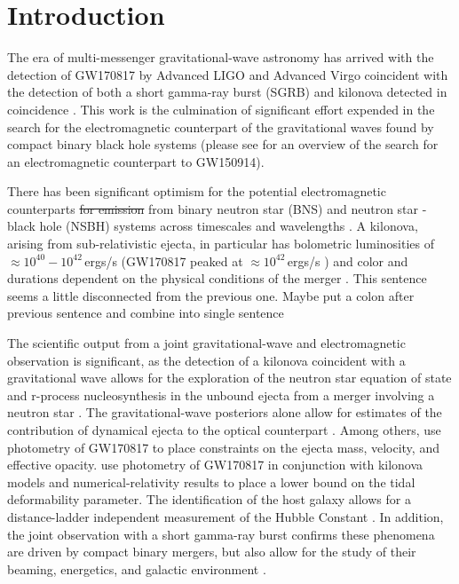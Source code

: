 \documentclass[twocolumn]{aastex62}
\begin{document}

\section{Introduction}
\label{sec:Intro}

The era of multi-messenger gravitational-wave astronomy has arrived with the detection of GW170817 \citep{AbEA2017b} by Advanced LIGO \citep{aLIGO} and Advanced Virgo \citep{adVirgo} coincident with the detection of both a short gamma-ray burst (SGRB) \citep{AbEA2017c,AbEA2017d,AbEA2017e} and kilonova detected in coincidence \citep{CoFo2017,SmCh2017,AbEA2017f}. 
This work is the culmination of significant effort expended in the search for the electromagnetic counterpart of the gravitational waves found by compact binary black hole systems \citep{AbEA2016a,AbEA2016g,AbEA2017} (please see \cite{AbEA2016b} for an overview of the search for an electromagnetic counterpart to GW150914).

There has been significant optimism for the potential electromagnetic counterparts \sout{for emission} from binary neutron star {\color{green}(BNS)} and neutron star - black hole {\color{green}(NSBH)} systems across timescales and wavelengths \citep{Nakar2007,MeBe2012}. 
A  kilonova, arising from sub-relativistic ejecta, in particular has bolometric luminosities of $\approx 10^{40}-10^{42}$\,ergs/s \citep{MeBa2015,BaKa2013} (GW170817 peaked at $\approx 10^{42}$\,ergs/s \citep{SmCh2017})
and color and durations dependent on the physical conditions of the merger \citep{MeMa2010,KaBa2013,BaKa2013,TaHo2013,KaFe2015,BaKa2016,Me2017}.{\color{red} This sentence seems a little disconnected from the previous one. Maybe put a colon after previous sentence and combine into single sentence}

The scientific output from a joint gravitational-wave and electromagnetic observation is significant, as the detection of a kilonova coincident with a gravitational wave allows for the exploration of the neutron star equation of state \citep{BaBa2013} and r-process nucleosynthesis in the unbound ejecta from a merger involving a neutron star \citep{MeBa2015,JuBa2015,RoLi2017,WuFe2016}.
The gravitational-wave posteriors alone allow for estimates of the contribution of dynamical ejecta to the optical counterpart \cite{AbEA2017g}.
Among others, \cite{SmCh2017} use photometry of GW170817 to place constraints on the ejecta mass, velocity, and effective opacity.
\cite{RaPe2018} use photometry of GW170817 in conjunction with kilonova models and numerical-relativity results to place a lower bound on the tidal deformability parameter. 
The identification of the host galaxy allows for a distance-ladder independent measurement of the Hubble Constant \citep{AbEA2017h}.
In addition, the joint observation with a short gamma-ray burst confirms these phenomena are driven by compact binary mergers, but also allow for the study of their beaming, energetics, and galactic environment \citep{MeBe2012}.
\end{document}
